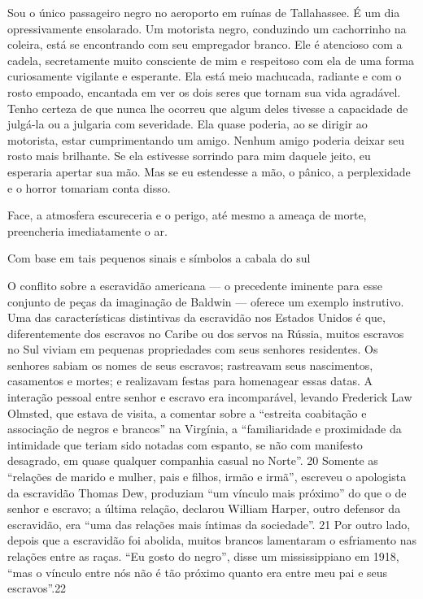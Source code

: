  \par 
Sou o único passageiro negro no aeroporto em ruínas de Tallahassee. É um dia opressivamente ensolarado. Um motorista negro, conduzindo um cachorrinho na coleira, está se encontrando com seu empregador branco. Ele é atencioso com a cadela, secretamente muito consciente de mim e respeitoso com ela de uma forma curiosamente vigilante e esperante. Ela está meio machucada, radiante e com o rosto empoado, encantada em ver os dois seres que tornam sua vida agradável. Tenho certeza de que nunca lhe ocorreu que algum deles tivesse a capacidade de julgá-la ou a julgaria com severidade. Ela quase poderia, ao se dirigir ao motorista, estar cumprimentando um amigo. Nenhum amigo poderia deixar seu rosto mais brilhante. Se ela estivesse sorrindo para mim daquele jeito, eu esperaria apertar sua mão. Mas se eu estendesse a mão, o pânico, a perplexidade e o horror tomariam conta disso.
 \par 
Face, a atmosfera escureceria e o perigo, até mesmo a ameaça de morte, preencheria imediatamente o ar.
 \par 
Com base em tais pequenos sinais e símbolos a cabala do sul
 \par 
O conflito sobre a escravidão americana — o precedente iminente para esse conjunto de peças da imaginação de Baldwin — oferece um exemplo instrutivo. Uma das características distintivas da escravidão nos Estados Unidos é que, diferentemente dos escravos no Caribe ou dos servos na Rússia, muitos escravos no Sul viviam em pequenas propriedades com seus senhores residentes. Os senhores sabiam os nomes de seus escravos; rastreavam seus nascimentos, casamentos e mortes; e realizavam festas para homenagear essas datas. A interação pessoal entre senhor e escravo era incomparável, levando Frederick Law Olmsted, que estava de visita, a comentar sobre a “estreita coabitação e associação de negros e brancos” na Virgínia, a “familiaridade e proximidade da intimidade que teriam sido notadas com espanto, se não com manifesto desagrado, em quase qualquer companhia casual no Norte”. {\color{blue}20} Somente as “relações de marido e mulher, pais e filhos, irmão e irmã”, escreveu o apologista da escravidão Thomas Dew, produziam “um vínculo mais próximo” do que o de senhor e escravo; a última relação, declarou William Harper, outro defensor da escravidão, era “uma das relações mais íntimas da sociedade”. {\color{blue}21} Por outro lado, depois que a escravidão foi abolida, muitos brancos lamentaram o esfriamento nas relações entre as raças. “Eu gosto do negro”, disse um mississippiano em 1918, “mas o vínculo entre nós não é tão próximo quanto era entre meu pai e seus escravos”.{\color{blue}22}
